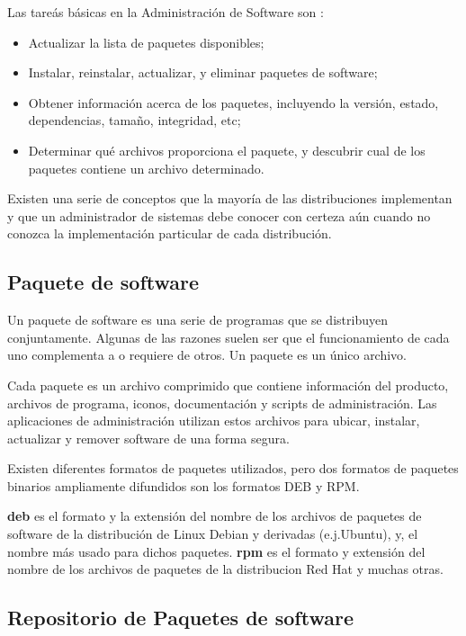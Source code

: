 \documentclass[12pt]{article}
\begin{document}
Las tareás básicas en la Administración de Software son :
\begin{itemize}
\item Actualizar la lista de paquetes disponibles;
\item Instalar, reinstalar, actualizar, y eliminar paquetes de software;
\item Obtener información acerca de los paquetes, incluyendo la versión, estado, dependencias, tamaño, integridad, etc;
\item Determinar qué archivos proporciona el paquete, y descubrir cual de los paquetes contiene un archivo determinado.
\end{itemize}

Existen una serie de conceptos que la 
mayoría de las distribuciones implementan y que un administrador de 
sistemas debe conocer con certeza aún cuando no conozca la implementación
particular de cada distribución.  


\subsection*{Paquete de software}


Un paquete de software es una serie de programas que se distribuyen conjuntamente. Algunas de las razones suelen ser que el funcionamiento de cada uno complementa a o requiere de otros. Un paquete es un único archivo.


Cada paquete es un archivo comprimido que contiene información del producto, archivos de programa, iconos, documentación y scripts de administración. Las aplicaciones de administración utilizan estos archivos para ubicar, instalar, actualizar y remover software de una forma segura. 

Existen diferentes formatos de paquetes utilizados, pero 
dos formatos de paquetes binarios ampliamente difundidos son los formatos DEB y RPM.

{\bf deb} es el formato y la extensión del nombre de los archivos de paquetes de software de la distribución de Linux Debian y derivadas (e.j.Ubuntu), y, el nombre más usado para dichos paquetes. 
{\bf rpm} es el formato y extensión del nombre de los archivos de paquetes de la distribucion Red Hat y muchas otras.


\subsection*{Repositorio de Paquetes de software}
\end{document}
